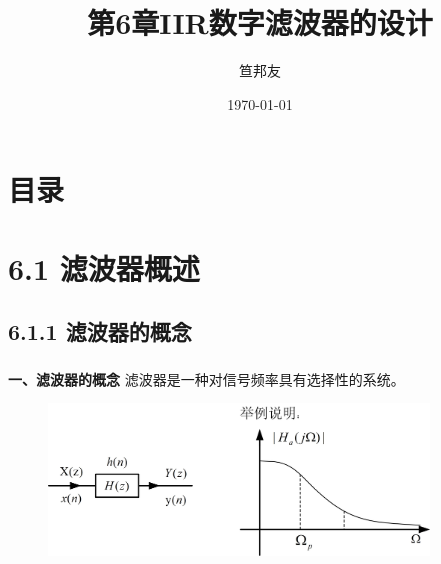 \documentclass[notheorems,compress,mathserif,table]{beamer}
\title{\heiti 第6章\quad  IIR数字滤波器的设计}
\author[\textcolor{blue}]{{\sihao\kaishu  笪邦友}}
\institute{\sihao\lishu  \textcolor{violet}{中南民族大学~~ 电子信息工程学院}}
\date{\fangsong\today}
\begin{document}
	\kaishu
	\frame{ \titlepage }
	\section*{目录}
	
\section{6.1 滤波器概述}

\subsection{6.1.1 滤波器的概念}
\begin{frame}\frametitle{}%
\textbf{\heiti 一、滤波器的概念}
\newline
滤波器是一种对信号频率具有选择性的系统。
\begin{figure}[h]
  \centering
  \includegraphics[width=0.9\textwidth]{fig1_lvboqigainian.jpg}
\end{figure}
\end{frame}

%
\end{document}
